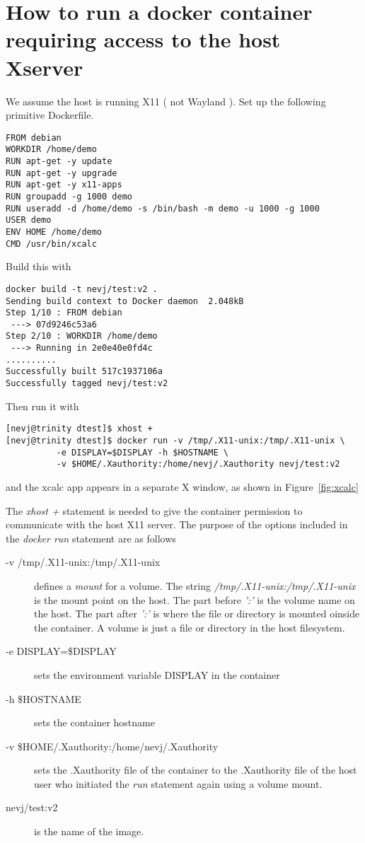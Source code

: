 \documentclass[a4paper]{article}  %
\begin{document}
\section{How to run a docker container requiring access to the host Xserver}
We assume the host is running X11 ( not Wayland ). Set up the following primitive Dockerfile.
\begin{tcolorbox}
\begin{verbatim}
FROM debian
WORKDIR /home/demo
RUN apt-get -y update
RUN apt-get -y upgrade
RUN apt-get -y x11-apps
RUN groupadd -g 1000 demo
RUN useradd -d /home/demo -s /bin/bash -m demo -u 1000 -g 1000
USER demo
ENV HOME /home/demo
CMD /usr/bin/xcalc
\end{verbatim}
\end{tcolorbox}
 Build this with 
\begin{tcolorbox}
\begin{verbatim}
docker build -t nevj/test:v2 .
Sending build context to Docker daemon  2.048kB
Step 1/10 : FROM debian
 ---> 07d9246c53a6
Step 2/10 : WORKDIR /home/demo
 ---> Running in 2e0e40e0fd4c
..........
Successfully built 517c1937106a
Successfully tagged nevj/test:v2
\end{verbatim}
\end{tcolorbox}
 Then run it with
\begin{tcolorbox}
\begin{verbatim}
[nevj@trinity dtest]$ xhost +
[nevj@trinity dtest]$ docker run -v /tmp/.X11-unix:/tmp/.X11-unix \
          -e DISPLAY=$DISPLAY -h $HOSTNAME \
          -v $HOME/.Xauthority:/home/nevj/.Xauthority nevj/test:v2
\end{verbatim}
\end{tcolorbox}
and the xcalc app appears in a separate X window, as shown in Figure~\ref{fig:xcalc}

The {\em xhost +} statement is needed to give the container permission to communicate with the host X11 server. 
 The purpose of the options included in the {\em docker run} statement are as follows
\begin{description}
\item[-v /tmp/.X11-unix:/tmp/.X11-unix] defines a {\em mount} for a volume. The string {\em /tmp/.X11-unix:/tmp/.X11-unix} is the mount point on the host. The part before {\em ':'} is the volume name on the host. The part after {\em ':'} is where the file or directory is mounted oinside the container. A volume is just a file or directory in the host filesystem.
\item[-e DISPLAY=\$DISPLAY] sets the environment variable DISPLAY in the container
\item[-h \$HOSTNAME] sets the container hostname
\item[-v \$HOME/.Xauthority:/home/nevj/.Xauthority] sets the .Xauthority file of the container to the .Xauthority file of the host user who initiated the {\em run} statement again using a volume mount.
\item[nevj/test:v2] is the name of the image.
\end{description}
\end{document}

